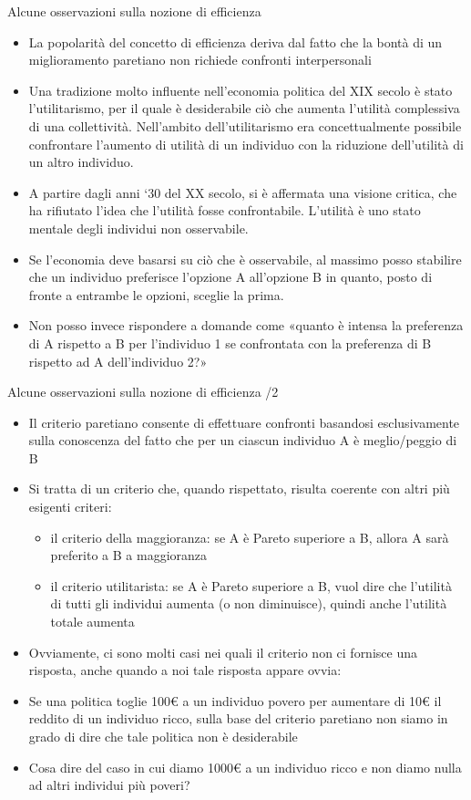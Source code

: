 \documentclass[aspectratio=149,11pt]{beamer}
\begin{document}
\begin{frame}{Alcune osservazioni sulla nozione di efficienza}
\begin{itemize}
\item La popolarità del concetto di efficienza deriva dal fatto che la bontà di un miglioramento paretiano non richiede confronti interpersonali
\item Una tradizione molto influente nell’economia politica del XIX secolo è stato l’utilitarismo, per il quale è desiderabile ciò che aumenta l’utilità complessiva di una collettività. Nell’ambito dell’utilitarismo era concettualmente possibile confrontare l’aumento di utilità di un individuo con la riduzione dell’utilità di un altro individuo.
\item A partire dagli anni ‘30 del XX secolo, si è affermata una visione critica, che ha rifiutato l’idea che l’utilità fosse confrontabile. L’utilità è uno stato mentale degli individui non osservabile.
\item Se l’economia deve basarsi su ciò che è osservabile, al massimo posso stabilire che un individuo preferisce l’opzione A all’opzione B in quanto, posto di fronte a entrambe le opzioni, sceglie la prima.
\item Non posso invece rispondere a domande come «quanto è intensa la preferenza di A rispetto a B per l’individuo 1 se confrontata con la preferenza di B rispetto ad A dell’individuo 2?»
\end{itemize}
\end{frame}

\begin{frame}{Alcune osservazioni sulla nozione di efficienza /2}
\begin{itemize}
\item Il criterio paretiano consente di effettuare confronti basandosi esclusivamente sulla conoscenza del fatto che per un ciascun individuo A è meglio/peggio di B
\item Si tratta di un criterio che, quando rispettato, risulta coerente con altri più esigenti criteri:
\begin{itemize}
\item il criterio della maggioranza: se A è Pareto superiore a B, allora A sarà preferito a B a maggioranza
\item il criterio utilitarista: se A è Pareto superiore a B, vuol dire che l’utilità di tutti gli individui aumenta (o non diminuisce), quindi anche l’utilità totale aumenta
\end{itemize}
\item Ovviamente, ci sono molti casi nei quali il criterio non ci fornisce una risposta, anche quando a noi tale risposta appare ovvia:
\item Se una politica toglie 100€ a un individuo povero per aumentare di 10€ il reddito di un individuo ricco, sulla base del criterio paretiano non siamo in grado di dire che tale politica non è desiderabile
\item Cosa dire del caso in cui diamo 1000€ a un individuo ricco e non diamo nulla ad altri individui più poveri?
\end{itemize}
\end{frame}
\end{document}
